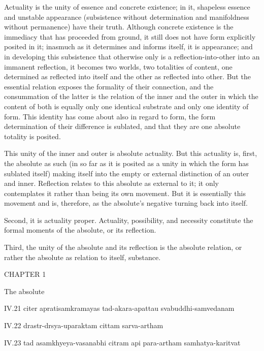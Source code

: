 Actuality is the unity of essence and concrete existence;
in it, shapeless essence and unstable appearance
(subsistence without determination
and manifoldness without permanence)
have their truth.
Although concrete existence is the immediacy
that has proceeded from ground,
it still does not have form explicitly posited in it;
inasmuch as it determines and informs itself, it is appearance;
and in developing this subsistence that otherwise only is
a reflection-into-other into an immanent reflection,
it becomes two worlds, two totalities of content,
one determined as reflected into itself
and the other as reflected into other.
But the essential relation exposes
the formality of their connection,
and the consummation of the latter is
the relation of the inner and the outer
in which the content of both is equally
only one identical substrate
and only one identity of form.
This identity has come about also in regard to form,
the form determination of their difference is sublated,
and that they are one absolute totality is posited.

This unity of the inner and outer is absolute actuality.
But this actuality is, first, the absolute as such
(in so far as it is posited as a unity
in which the form has sublated itself)
making itself into the empty or external
distinction of an outer and inner.
Reflection relates to this absolute
as external to it;
it only contemplates it
rather than being its own movement.
But it is essentially this movement
and is, therefore, as the absolute's
negative turning back into itself.

Second, it is actuality proper.
Actuality, possibility, and necessity constitute
the formal moments of the absolute,
or its reflection.

Third, the unity of the absolute
and its reflection is
the absolute relation,
or rather the absolute as
relation to itself, substance.

CHAPTER 1

The absolute

IV.21
citer apratisamkramayas tad-akara-apattau svabuddhi-samvedanam

IV.22
drastr-drsya-uparaktam cittam sarva-artham

IV.23
tad asamkhyeya-vasanabhi citram api para-artham samhatya-karitvat


